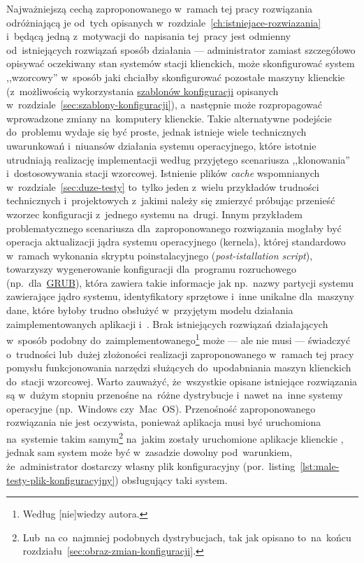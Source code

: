 \documentclass[thesis]{subfiles}
\begin{document}
Najważniejszą cechą zaproponowanego w~ramach tej pracy rozwiązania odróżniającą je od~tych opisanych w~rozdziale~\ref{ch:istniejace-rozwiazania} i~będącą jedną z~motywacji do~napisania tej~pracy jest odmienny od~istniejących rozwiązań sposób działania --- administrator zamiast szczegółowo opisywać oczekiwany stan systemów stacji klienckich, może skonfigurować system ,,wzorcowy'' w~sposób jaki chciałby skonfigurować pozostałe maszyny klienckie (z~możliwością wykorzystania \hyperref[sec:szablony-konfiguracji]{szablonów konfiguracji} opisanych w~rozdziale~\ref{sec:szablony-konfiguracji}), a~następnie może rozpropagować wprowadzone zmiany na~komputery klienckie. Takie alternatywne podejście do~problemu wydaje się być proste, jednak istnieje wiele technicznych uwarunkowań i~niuansów działania systemu operacyjnego, które istotnie utrudniają realizację implementacji według przyjętego scenariusza ,,klonowania'' i~dostosowywania stacji wzorcowej. Istnienie plików \emph{cache} wspomnianych w~rozdziale~\ref{sec:duze-testy} to~tylko jeden z~wielu przykładów trudności technicznych i~projektowych z~jakimi należy się zmierzyć próbując przenieść wzorzec konfiguracji z~jednego systemu na~drugi. Innym przykładem problematycznego scenariusza dla~zaproponowanego rozwiązania mogłaby być operacja aktualizacji jądra systemu operacyjnego (kernela), której standardowo w~ramach wykonania skryptu poinstalacyjnego (\emph{post-istallation script}), towarzyszy wygenerowanie konfiguracji dla~programu rozruchowego (np.~dla~\href{https://en.wikipedia.org/wiki/GNU_GRUB}{GRUB}), która zawiera takie informacje jak np.~nazwy partycji systemu zawierające jądro systemu, identyfikatory sprzętowe i~inne unikalne dla~maszyny dane, które byłoby trudno obsłużyć w~przyjętym modelu działania zaimplementowanych aplikacji \texttt{\srvappname{}} i~\texttt{\cliappname{}}. Brak istniejących rozwiązań działających w~sposób podobny do~zaimplementowanego\footnote{Według [nie]wiedzy autora.} może --- ale nie musi --- świadczyć o~trudności lub~dużej złożoności realizacji zaproponowanego w~ramach tej pracy pomysłu funkcjonowania narzędzi służących do~upodabniania maszyn klienckich do~stacji wzorcowej. Warto zauważyć, że~wszystkie opisane istniejące rozwiązania są w~dużym stopniu przenośne na~różne dystrybucje i~nawet na~inne systemy operacyjne (np.~Windows czy~Mac~OS). Przenośność zaproponowanego rozwiązania nie jest oczywista, ponieważ aplikacja \texttt{\srvappname{}} musi być uruchomiona na~systemie takim samym\footnote{Lub~na co~najmniej podobnych dystrybucjach, tak jak opisano to~na~końcu rozdziału~\ref{sec:obraz-zmian-konfiguracji}.} na~jakim zostały uruchomione aplikacje klienckie \texttt{\cliappname{}}, jednak sam system może być w~zasadzie dowolny pod~warunkiem, że~administrator dostarczy własny plik konfiguracyjny (por.~listing~\ref{lst:male-testy-plik-konfiguracyjny}) obsługujący taki system.
\end{document}
